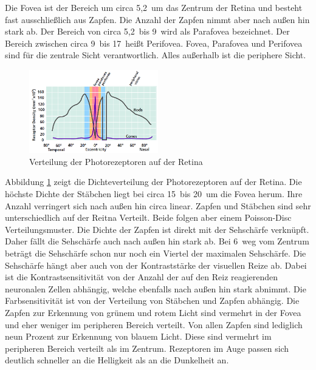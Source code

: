 Die Fovea ist der Bereich um circa 5,2\,\textdegree{} um das Zentrum der Retina und besteht fast ausschließlich aus Zapfen.
Die Anzahl der Zapfen nimmt aber nach außen hin stark ab.
Der Bereich von circa 5,2\,\textdegree{} bis 9\,\textdegree{} wird als Parafovea bezeichnet.
Der Bereich zwischen circa 9\,\textdegree{} bis 17\,\textdegree{} heißt Perifovea.
Fovea, Parafovea und Perifovea sind für die zentrale Sicht verantwortlich.
Alles außerhalb ist die periphere Sicht.
\begin{figure}
	\centering
	\includegraphics[width=0.5\textwidth]{../../Grafiken/Retinal-photoreceptor-distr_from-star-report.PNG}
	\caption{Verteilung der Photorezeptoren auf der Retina \cite{doi:10.1111/cfg.13150}}
	\label{fig::eye02}
\end{figure}
Abbildung \ref{fig::eye02} zeigt die Dichteverteilung der Photorezeptoren auf der Retina.
Die höchste Dichte der Stäbchen liegt bei circa 15\,\textdegree{} bis 20\,\textdegree{} um die Fovea herum.
Ihre Anzahl verringert sich nach außen hin circa linear.
Zapfen und Stäbchen sind sehr unterschiedlich auf der Reitna Verteilt.
Beide folgen aber einem Poisson-Disc Verteilungsmuster.
Die Dichte der Zapfen ist direkt mit der Sehschärfe verknüpft.
Daher fällt die Sehschärfe auch nach außen hin stark ab.
Bei 6\,\textdegree{} weg vom Zentrum beträgt die Sehschärfe schon nur noch ein Viertel der maximalen Sehschärfe.
Die Sehschärfe hängt aber auch von der Kontraststärke der visuellen Reize ab.
Dabei ist die Kontrastsensitivität von der Anzahl der auf den Reiz reagierenden neuronalen Zellen abhängig, welche ebenfalls nach außen hin stark abnimmt.
Die Farbsensitivität ist von der Verteilung von Stäbchen und Zapfen abhängig.
Die Zapfen zur Erkennung von grünem und rotem Licht sind vermehrt in der Fovea und eher weniger im peripheren Bereich verteilt.
Von allen Zapfen sind lediglich neun Prozent zur Erkennung von blauem Licht.
Diese sind vermehrt im peripheren Bereich verteilt als im Zentrum.
Rezeptoren im Auge passen sich deutlich schneller an die Helligkeit als an die Dunkelheit an.

